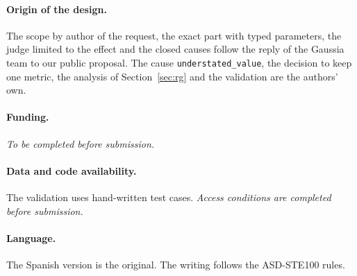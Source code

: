 \documentclass[11pt,a4paper]{article}
\begin{document}
\paragraph{Origin of the design.} The scope by author of the request, the exact part with typed parameters, the
judge limited to the effect and the closed causes follow the reply of the Gaussia team to our public proposal.
The cause \texttt{understated\_value}, the decision to keep one metric, the analysis of Section~\ref{sec:rg} and
the validation are the authors' own.

\paragraph{Funding.} \textit{To be completed before submission.}

\paragraph{Data and code availability.} The validation uses hand-written test cases. \textit{Access conditions
are completed before submission.}

\paragraph{Language.} The Spanish version is the original. The writing follows the ASD-STE100 rules.



\end{document}
